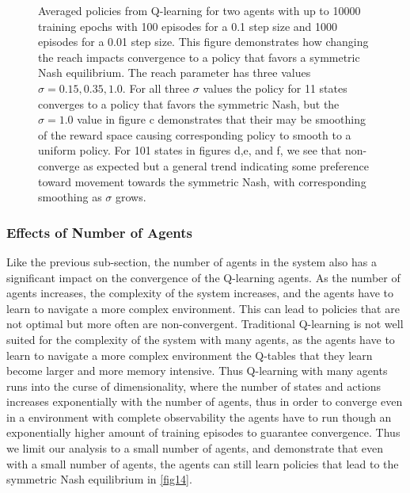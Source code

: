 \documentclass{article}
\begin{document}
\begin{figure}[ht!]
                        \caption{Averaged policies from Q-learning for two agents with up to 10000 training epochs with 100 episodes for a 0.1 step size and 1000 episodes for a 0.01 step size. This figure demonstrates how changing the reach impacts convergence to a policy that favors a symmetric Nash equilibrium. The reach parameter has three values $\sigma=0.15,0.35,1.0$. For all three $\sigma$ values the policy for 11 states converges to a policy that favors the symmetric Nash, but the $\sigma=1.0$ value in figure c demonstrates that their may be smoothing of the reward space causing corresponding policy to smooth to a uniform policy. For 101 states in figures d,e, and f, we see that non-converge as expected but a general trend indicating some preference toward movement towards the symmetric Nash, with corresponding smoothing as $\sigma$ grows.} 
                        \label{fig13}
                    \end{figure}
    
            \clearpage
    
            \subsubsection{Effects of Number of Agents}
                Like the previous sub-section, the number of agents in the system also has a significant impact on the convergence of the Q-learning agents. As the number of agents increases, the complexity of the system increases, and the agents have to learn to navigate a more complex environment. This can lead to policies that are not optimal but more often are non-convergent. Traditional Q-learning is not well suited for the complexity of the system with many agents, as the agents have to learn to navigate a more complex environment the Q-tables that they learn become larger and more memory intensive. Thus Q-learning with many agents runs into the curse of dimensionality, where the number of states and actions increases exponentially with the number of agents, thus in order to converge even in a environment with complete observability the agents have to run though an exponentially higher amount of training episodes to guarantee convergence. Thus we limit our analysis to a small number of agents, and demonstrate that even with a small number of agents, the agents can still learn policies that lead to the symmetric Nash equilibrium in \cref{fig14}.
    
\end{document}
